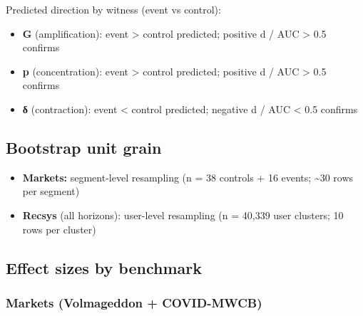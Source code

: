 \documentclass[
  11pt,
]{article}
\providecommand{\tightlist}{%
  \setlength{\itemsep}{0pt}\setlength{\parskip}{0pt}}
\begin{document}
Predicted direction by witness (event vs control):

\begin{itemize}
\tightlist
\item
  \textbf{G} (amplification): event \textgreater{} control predicted;
  positive d / AUC \textgreater{} 0.5 confirms
\item
  \textbf{p} (concentration): event \textgreater{} control predicted;
  positive d / AUC \textgreater{} 0.5 confirms
\item
  \textbf{δ} (contraction): event \textless{} control predicted;
  negative d / AUC \textless{} 0.5 confirms
\end{itemize}

\subsection{Bootstrap unit grain}\label{bootstrap-unit-grain}

\begin{itemize}
\tightlist
\item
  \textbf{Markets:} segment-level resampling (n = 38 controls + 16
  events; \textasciitilde30 rows per segment)
\item
  \textbf{Recsys} (all horizons): user-level resampling (n = 40,339 user
  clusters; 10 rows per cluster)
\end{itemize}

\subsection{Effect sizes by benchmark}\label{effect-sizes-by-benchmark}

\subsubsection{Markets (Volmageddon +
COVID-MWCB)}\label{markets-volmageddon-covid-mwcb}
\end{document}
